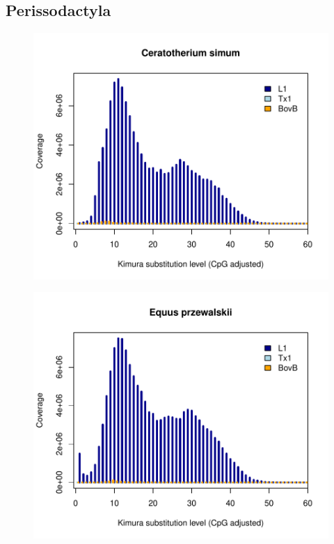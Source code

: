 \documentclass[12pt,a4paper,times]{article}
\begin{document}
\subsection*{Perissodactyla}

\begin{figure}[H]
	\centering
	\includegraphics[scale=0.8]{suppFigures/divergencePlots/Ceratotherium_simum.pdf}
	\caption{\label{Ceratotherium_simum}}
\end{figure}

\begin{figure}[H]
	\centering
	\includegraphics[scale=0.8]{suppFigures/divergencePlots/Equus_przewalskii.pdf}
	\caption{\label{Equus_przewalskii}}
\end{figure}
\end{document}
